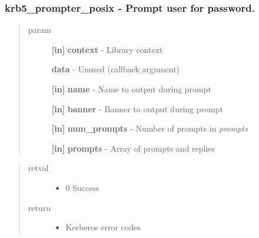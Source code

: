 \documentclass[letterpaper,10pt,english]{sphinxmanual}
\begin{document}
\subsubsection{krb5\_prompter\_posix -  Prompt user for password.}
\label{appdev/refs/api/krb5_prompter_posix:krb5-prompter-posix-prompt-user-for-password}\label{appdev/refs/api/krb5_prompter_posix::doc}

\begin{fulllineitems}
\label{appdev/refs/api/krb5_prompter_posix:c.krb5_prompter_posix}
\end{fulllineitems}

\begin{quote}\begin{description}
\item[{param}] \leavevmode
\textbf{{[}in{]}} \textbf{context} - Library context

\textbf{data} - Unused (callback argument)

\textbf{{[}in{]}} \textbf{name} - Name to output during prompt

\textbf{{[}in{]}} \textbf{banner} - Banner to output during prompt

\textbf{{[}in{]}} \textbf{num\_prompts} - Number of prompts in \emph{prompts}

\textbf{{[}in{]}} \textbf{prompts} - Array of prompts and replies

\end{description}\end{quote}
\begin{quote}\begin{description}
\item[{retval}] \leavevmode\begin{itemize}
\item {} 
0   Success

\end{itemize}

\item[{return}] \leavevmode\begin{itemize}
\item {} 
Kerberos error codes

\end{itemize}

\end{description}\end{quote}
\end{document}
